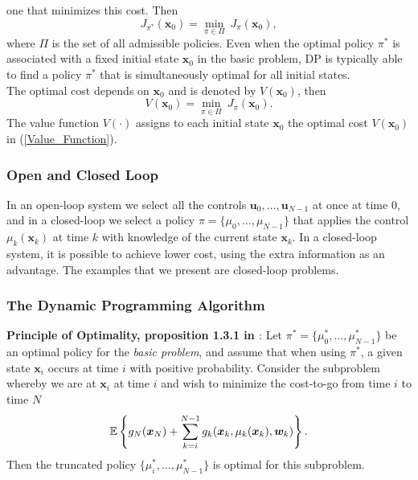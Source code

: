 one that minimizes this cost. Then
\begin{equation*}
J_{\pi^*}(\bm{x}_0)=\min_{\pi\in\Pi}\ J_\pi(\bm{x}_0),
\end{equation*}
where $\Pi$ is the set of all admissible policies. Even when the optimal
policy $\pi^*$ is associated with a fixed initial state $\bm{x}_0$ in the
basic problem, DP is typically able to find a policy $\pi^*$ that 
is simultaneously optimal for all initial states.\\
The optimal cost depends on $\bm{x}_0$ and is denoted by $V(\bm{x}_0)$, then
\begin{equation}
V(\bm{x}_0)=\min_{\pi\in\Pi}\ J_\pi(\bm{x}_0).
\label{Value_Function}
\end{equation}
The value function $V(\cdot)$ assigns to each initial state $\bm{x}_0$ 
the optimal cost $V(\bm{x}_0)$ in (\ref{Value_Function}).

\subsubsection{Open and Closed Loop} \label{Subsection_OLCO}

In an open-loop system we select all the controls $\bm{u}_0,\dots,\bm{u}_{N-1}$ at 
once at time $0$, and in a closed-loop we select a policy $\pi=\{\mu_0,\dots,\mu_{N-1}\}$ 
that applies the control $\mu_k(\bm{x}_k)$ at time $k$ with knowledge of the current 
state $\bm{x}_k$. In a closed-loop system, it is possible to achieve lower cost, using 
the extra information as an advantage. The examples that 
we present are closed-loop problems.

\subsubsection{The Dynamic Programming Algorithm}

\textbf{Principle of Optimality, proposition 1.3.1 in \cite{bertsekas1995dynamic}}: Let $\pi^*=\{\mu_0^*,\dots,\mu^*_{N-1}\}$ be an 
optimal policy for the \textit{basic problem}, and assume that when using $\pi^*$, a 
given state $\bm{x}_i$ occurs at time $i$ with positive probability. Consider the 
subproblem whereby we are at $\bm{x}_i$ at time $i$ and wish to minimize the 
cost-to-go from time $i$ to time $N$
\begin{equation*}
\mathbb{E}\left\{g_N(\bm{x}_N)+\sum_{k=i}^{N-1}g_k(\bm{x}_k,\mu_k(\bm{x}_k),\bm{w}_k)\right\}.
\end{equation*}
Then the truncated policy $\{\mu_i^*,\dots,\mu^*_{N-1}\}$ is optimal for this subproblem.\\

